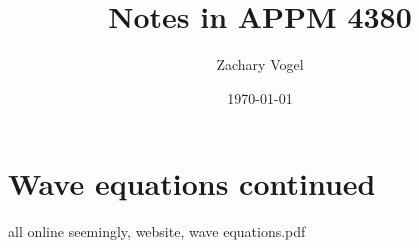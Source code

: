 \documentclass{article}
\author{Zachary Vogel}
\title{Notes in APPM 4380}
\date{\today}
\begin{document}
\maketitle
\section{Wave equations continued}
all online seemingly, website, wave equations.pdf
\end{document}
